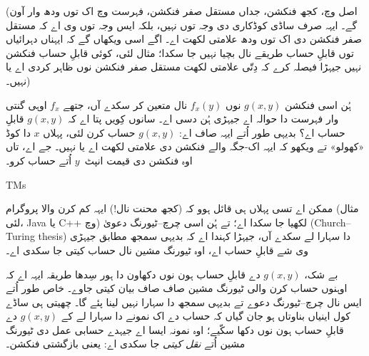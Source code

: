 \documentclass[../../../include/open-logic-section]{subfiles}
\begin{document}
(اصل وچ، کجھ فنکشن، جداں مستقل صفر فنکشن، فہرست
وچ اک توں ودھ وار آون گے۔ ایہہ صرف ساڈی کوڈکاری
دی وجہ توں نہیں، بلکہ ایس وجہ توں وی اے کہ
مستقل صفر فنکشن دی اک توں ودھ علامتی لکھت اے۔
اگے اسی ویکھاں گے کہ ایہناں دہرائیاں توں قابلِ
حساب طریقے نال بچیا نہیں جا سکدا؛ مثال لئی، کوئی
قابلِ حساب فنکشن نہیں جیہڑا فیصلہ کرے کہ دِتّی
علامتی لکھت مستقل صفر فنکشن نوں ظاہر کردی اے
یا نہیں۔)

ہُن اسی فنکشن $g(x,y)$ نوں $f_x(y)$ نال
متعین کر سکدے آں، جتھے $f_x$ اوہی گنتی وار
فہرست دا حوالہ اے جیہڑی ہُن دسی اے۔ سانوں کِویں
پتا اے کہ $g(x,y)$ قابلِ حساب اے؟ بدیہی طور اُتے
ایہہ صاف اے: $g(x,y)$ حساب کرن لئی، پہلاں
$x$ دا کوڈ «کھولو» تے ویکھو کہ ایہہ اک-جگہ
والے فنکشن دی علامتی لکھت اے یا نہیں۔ جے اے،
تاں اوہ فنکشن دی قیمت انپٹ~$y$ اُتے حساب کرو۔

\begin{tagblock}{TMs}
\begin{digress}
ممکن اے تسی پہلاں ہی قائل ہوو کہ (کجھ محنت نال!)
ایہہ کم کرن والا پروگرام (مثال لئی، Java یا C++
وچ) لکھیا جا سکدا اے؛ تے ہُن اسی چرچ--ٹیورنگ
دعویٰ (Church--Turing thesis) دا سہارا لے سکدے
آں، جیہڑا کہندا اے کہ بدیہی سمجھ مطابق جیہڑی وی
شے قابلِ حساب اے، اوہ ٹیورنگ مشین نال حساب کیتی
جا سکدی اے۔

بے شک، $g(x,y)$ دے قابلِ حساب ہون نوں دکھاون
دا ہور سِدھا طریقہ ایہہ اے کہ اوہنوں حساب کرن
والی ٹیورنگ مشین صاف صاف بیان کیتی جاوے۔ خاص
طور اُتے ایس نال چرچ--ٹیورنگ دعوے تے بدیہی سمجھ
دا سہارا نہیں لینا پئے گا۔ چھیتی ہی ساڈے کول
اینیاں بناوتاں ہو جان گیاں کہ حساب دے اک نمونے
دا سہارا لے کے $g(x,y)$ دے قابلِ حساب ہون نوں
دکھا سکّیے؛ اوہ نمونہ ایسا اے جیہدے حسابی عمل دی ٹیورنگ مشین اُتے
\emph{نقل کیتی} جا سکدی اے: یعنی بازگشتی فنکشن۔
\end{digress}
\end{tagblock}
\end{document}
